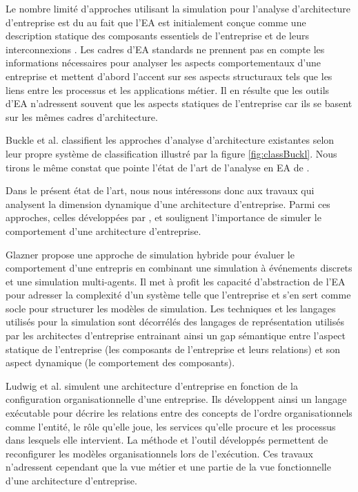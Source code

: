 Le nombre limité d'approches utilisant la simulation pour l'analyse
d'architecture d'entreprise est du au fait que l'EA est initialement conçue
comme une description statique des composants essentiels de l'entreprise et de
leurs interconnexions \cite{hoffman2013enterprise}. Les cadres d'EA standards
ne prennent pas en compte les informations nécessaires pour analyser les
aspects comportementaux d'une entreprise et mettent d'abord l'accent sur ses
aspects structuraux tels que les liens entre les processus et les applications
métier. Il en résulte que les outils d'EA n'adressent souvent que les aspects
statiques de l'entreprise car ils se basent sur les mêmes cadres d'architecture.

Buckle et al. \cite{buckl2009classifying} classifient les approches d'analyse d'architecture existantes selon leur propre système de classification illustré par la figure \ref{fig:classBuckl}. Nous tirons le même constat que pointe l'état de l'art de l'analyse en EA de \cite{manzur2015xarchimate}. 

Dans le présent état de l'art, nous nous intéressons donc aux travaux qui analysent la
dimension dynamique d'une architecture d'entreprise. Parmi ces approches,
celles développées par \cite{glazner2011enterprise},
\cite{ludwig2011organizational} et \cite{manzur2015xarchimate} soulignent
l'importance de simuler le comportement d'une architecture d'entreprise. 

Glazner \cite{glazner2011enterprise} propose une approche de simulation hybride pour
évaluer le comportement d'une entrepris en combinant une simulation à
événements discrets et une simulation multi-agents.
Il met à profit les capacité d'abstraction de l'EA pour adresser la complexité d'un système telle que l'entreprise et s'en sert
comme socle pour structurer les modèles de simulation. Les
techniques et les langages utilisés pour la simulation sont décorrélés des
langages de représentation utilisés par les architectes d'entreprise entrainant
ainsi un gap sémantique entre l'aspect statique de l'entreprise (les composants
de l'entreprise et leurs relations) et son aspect dynamique (le comportement
des composants). 

Ludwig et al. \cite{ludwig2011organizational} simulent une architecture d'entreprise en
fonction de la configuration organisationnelle d'une entreprise. Ils
développent ainsi un langage exécutable pour décrire les relations entre des
concepts de l'ordre organisationnels comme l'entité, le rôle
qu'elle joue, les services qu'elle procure et les processus dans lesquels elle
intervient. La méthode et l'outil développés permettent de reconfigurer les
modèles organisationnels lors de l'exécution. Ces travaux n'adressent cependant
que la vue métier et une partie de la vue fonctionnelle d'une architecture
d'entreprise.

